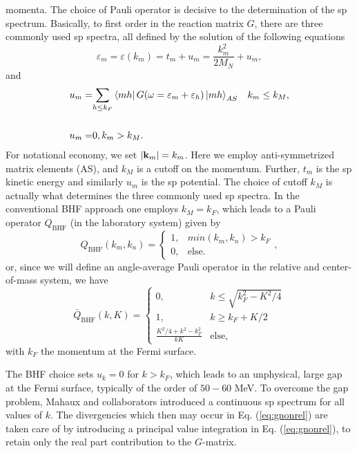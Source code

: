 momenta.
The choice of Pauli operator is decisive to the determination of the
sp
spectrum. Basically, to first order in the reaction matrix $G$,
there are three commonly used sp spectra, all
defined by the solution of the following equations
\begin{equation}
   \varepsilon_{m} = \varepsilon (k_{m})= t_{m} + u_{m}=\frac{k_{m}^2}{2M_N}+u_{m},
   \label{eq:spnrel}
\end{equation}
and
\begin{align}
   u_{m} =& {\displaystyle \sum_{h \leq k_F}}\left\langle m h \right| G(\omega = \varepsilon_{m} + \varepsilon_h )
   \left| m h \right\rangle_{AS}  \hspace{3mm}k_m \leq k_M,  \\ \\
   u_m=&0, k_m > k_M.
   \label{eq:selfcon}
\end{align}
For notational economy, we set $|{\bf k}_m|=k_m$.
Here we employ anti-symmetrized matrix elements (AS), and $k_M$ is a cutoff
on the momentum. Further, $t_m$ is the sp kinetic
energy and similarly $u_m$
is the
sp potential.
The choice of cutoff $k_M$ is actually what determines the three
commonly used sp spectra.
In the conventional BHF approach one employs $k_M = k_F$,
which leads
to a Pauli operator $Q_{\mathrm{BHF}}$ (in the laboratory system) given by
\begin{equation}
   Q_{\mathrm{BHF}}(k_m , k_n ) =
    \left\{\begin{array}{cc}1,&min(k_m ,k_n ) > k_F\\
    0,&\mathrm{else}.\end{array}\right.
    \label{eq:bhf},
\end{equation}
or, since we will define an
angle-average Pauli operator in the relative and center-of-mass
system, we have
\begin{equation}
     \bar{Q}_{\mathrm{BHF}}(k,K)=\left\{\begin{array}{cc}
         0,&k\leq \sqrt{k_{F}^{2}-K^2/4}\\
         1,&k\geq k_F + K/2\\
	\frac{K^2/4+k^2 -k_{F}^2}{kK}&\mathrm{else},\end{array}\right.
    \label{eq:qbhf}
\end{equation}
with $k_F$ the momentum at the Fermi surface.

The BHF choice sets $u_k = 0$ for $k > k_F$, which leads
to an unphysical, large gap at the Fermi surface, typically
of the order of $50-60$ MeV. 
To overcome the gap
problem, Mahaux and collaborators 
introduced a continuous sp spectrum
for all values of $k$. The divergencies
which then may occur in Eq. (\ref{eq:gnonrel}) are taken care of by
introducing
a principal value integration in Eq. (\ref{eq:gnonrel}),
to retain only the
real part contribution to the $G$-matrix.


